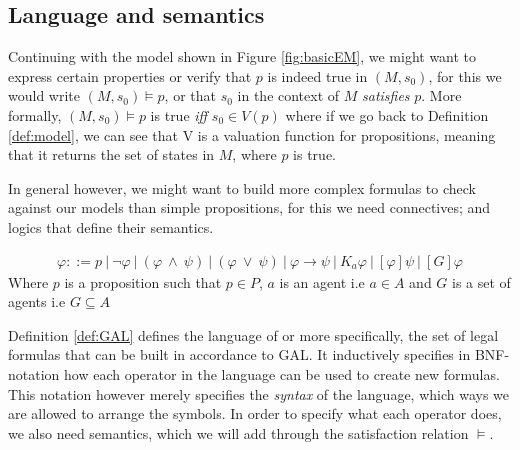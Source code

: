 \subsection{Language and semantics}

Continuing with the model shown in Figure \ref{fig:basicEM}, we might want to express certain properties or verify that $p$ is indeed true in $(M,s_0)$, for this we would write $(M,s_0) \models p$, or that $s_0$ in the context of $M$ \textit{satisfies} $p$. More formally, $(M,s_0) \models p$ is true \textit{iff} $s_0 \in V(p)$ where if we go back to Definition \ref{def:model}, we can see that V is a valuation function for propositions, meaning that it returns the set of states in $M$, where $p$ is true. 

In general however, we might want to build more complex formulas to check against our models than simple propositions, for this we need connectives; and logics that define their semantics.

\begin{definition} \hfill
	\label{def:GAL}
 	\begin{align*}
		\varphi ::= p \ | ~\neg\varphi ~|~ (\varphi~\wedge~\psi) ~|~ (\varphi~\vee~\psi) ~|~ \varphi 							\rightarrow \psi ~|~ K_a\varphi ~|~ [\varphi]\psi  ~|~ [G]\varphi
	\end{align*}
	Where $p$ is a proposition such that $p \in P$, $a$ is an agent i.e $a \in A$ and $G$ is a set of agents i.e $G \subseteq A$
\end{definition}

Definition \ref{def:GAL} defines the language of  or more specifically, the set of legal formulas that can be built in accordance to GAL. It inductively specifies in BNF-notation how each operator in the language can be used to create new formulas. This notation however merely specifies the \textit{syntax} of the language, which ways we are allowed to arrange the symbols. In order to specify what each operator does, we also need semantics, which we will add through the satisfaction relation $\models$.

